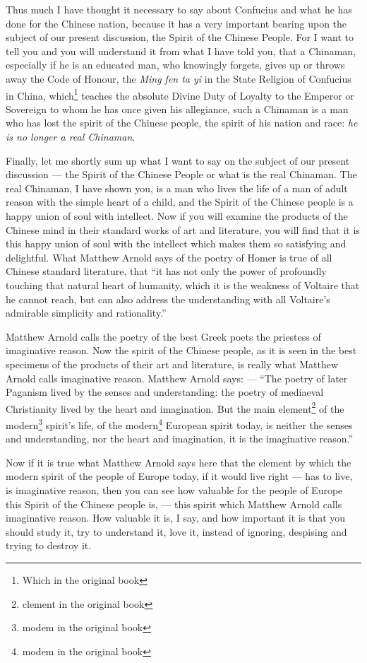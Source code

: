 Thus much I have thought it necessary to say about Confucius and what he has done for the Chinese nation, because it has a very important bearing upon the subject of our present discussion, the Spirit of the Chinese People.
For I want to tell you and you will understand it from what I have told you, that a Chinaman, especially if he is an educated man, who knowingly forgets, gives up or throws away the Code of Honour, the \emph{Ming fen ta yi} in the State Religion of Confucius in China, which\footnote{Which in the original book} teaches the absolute Divine Duty of Loyalty to the Emperor or Sovereign to whom he has once given his allegiance, such a Chinaman is a man who has lost the spirit of the Chinese people, the spirit of his nation and race: \emph{he is no longer a real Chinaman}.

Finally, let me shortly sum up what I want to say on the subject of our present discussion --- the Spirit of the Chinese People or what is the real Chinaman.
The real Chinaman, I have shown you, is a man who lives the life of a man of adult reason with the simple heart of a child, and the Spirit of the Chinese people is a happy union of soul with intellect.
Now if you will examine the products of the Chinese mind in their standard works of art and literature, you will find that it is this happy union of soul with the intellect which makes them so satisfying and delightful.
What Matthew Arnold says of the poetry of Homer is true of all Chinese standard literature, that ``it has not only the power of profoundly touching that natural heart of humanity, which it is the weakness of Voltaire that he cannot reach, but can also address the understanding with all Voltaire's admirable simplicity and rationality.''

Matthew Arnold calls the poetry of the best Greek poets the priestess of imaginative reason.
Now the spirit of the Chinese people, as it is seen in the best specimens of the products of their art and literature, is really what Matthew Arnold calls imaginative reason.
Matthew Arnold says: --- ``The poetry of later Paganism lived by the senses and understanding: the poetry of mediaeval Christianity lived by the heart and imagination. But the main element\footnote{clement in the original book} of the modern\footnote{modem in the original book} spirit's life, of the modern\footnote{modem in the original book} European spirit today, is neither the senses and understanding, nor the heart and imagination, it is the imaginative reason.''

Now if it is true what Matthew Arnold says here that the element by which the modern spirit of the people of Europe today, if it would live right --- has to live, is imaginative reason, then you can see how valuable for the people of Europe this Spirit of the Chinese people is, --- this spirit which Matthew Arnold calls imaginative reason.
How valuable it is, I say, and how important it is that you should study it, try to understand it, love it, instead of ignoring, despising and trying to destroy it.

